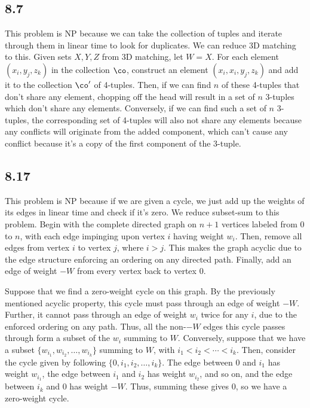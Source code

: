 \documentclass{article}
\begin{document}
\subsection*{8.7}
This problem is NP because we can take the collection of tuples and iterate through them in linear time to look for duplicates. We can reduce 3D matching to this. Given sets $X,Y,Z$ from 3D matching, let $W=X$. For each element $(x_i,y_j,z_k)$ in the collection $\co$, construct an element $(x_i,x_i,y_j,z_k)$ and add it to the collection $\co'$ of 4-tuples. Then, if we can find $n$ of these 4-tuples that don't share any element, chopping off the head will result in a set of $n$ 3-tuples which don't share any elements. Conversely, if we can find such a set of $n$ 3-tuples, the corresponding set of 4-tuples will also not share any elements because any conflicts will originate from the added component, which can't cause any conflict because it's a copy of the first component of the 3-tuple.
\subsection*{8.17}
This problem is NP because if we are given a cycle, we just add up the weights of its edges in linear time and check if it's zero. We reduce subset-sum to this problem. Begin with the complete directed graph on $n+1$ vertices labeled from $0$ to $n$, with each edge impinging upon vertex $i$ having weight $w_i$. Then, remove all edges from vertex $i$ to vertex $j$, where $i>j$. This makes the graph acyclic due to the edge structure enforcing an ordering on any directed path. Finally, add an edge of weight $-W$ from every vertex back to vertex $0$. 

Suppose that we find a zero-weight cycle on this graph. By the previously mentioned acyclic property, this cycle must pass through an edge of weight $-W$. Further, it cannot pass through an edge of weight $w_i$ twice for any $i$, due to the enforced ordering on any path. Thus, all the non-$-W$ edges this cycle passes through form a subset of the $w_i$ summing to $W$. Conversely, suppose that we have a subset $\{w_{i_1},w_{i_2},\ldots,w_{i_k}\}$ summing to $W$, with $i_1<i_2<\cdots<i_k$. Then, consider the cycle given by following $\{0,i_1,i_2,\ldots,i_k\}$. The edge between $0$ and $i_1$ has weight $w_{i_1}$, the edge between $i_1$ and $i_2$ has weight $w_{i_2}$, and so on, and the edge between $i_k$ and $0$ has weight $-W$. Thus, summing these gives $0$, so we have a zero-weight cycle.
\end{document}
